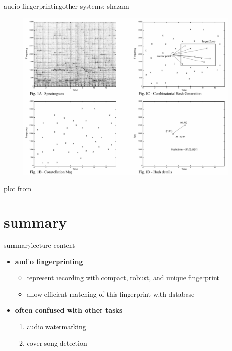         \begin{frame}{audio fingerprinting}{other systems: shazam}
            \vspace{-3mm}
            \begin{figure}
                \centering
                \includegraphics[scale=.23]{graph/fingerprint_shazaam}
            \end{figure}
            \vspace{-5mm}
            plot from 
            
        \end{frame}
    
    \section{summary}
        \begin{frame}{summary}{lecture content}
            \begin{itemize}
                \item   \textbf{audio fingerprinting}
                    \begin{itemize}
                        \item   represent recording with compact, robust, and unique fingerprint
                        \item   allow efficient matching of this fingerprint with database
                    \end{itemize}
                \bigskip
                \item   \textbf{often confused with other tasks}
                    \begin{enumerate}
                        \item   audio watermarking
                        \item   cover song detection
                    \end{enumerate}
            \end{itemize}
        \end{frame}

